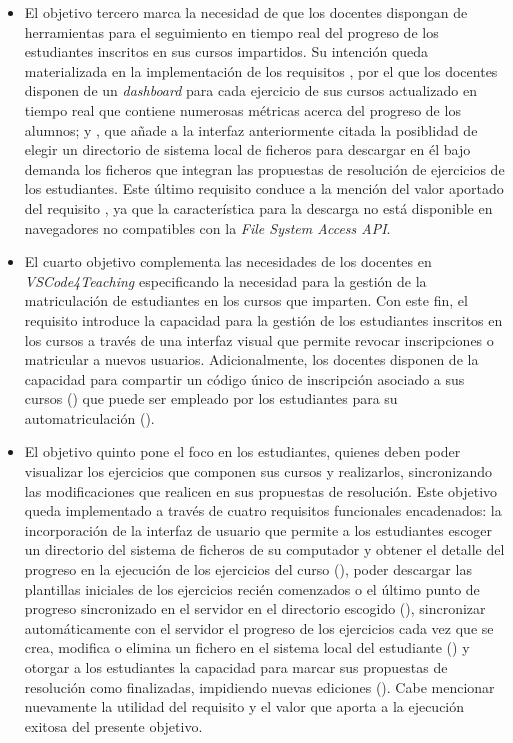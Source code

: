 \begin{itemize}
    \item El objetivo tercero marca la necesidad de que los docentes dispongan de herramientas para el seguimiento en tiempo real del progreso de los estudiantes inscritos en sus cursos impartidos. Su intención queda materializada en la implementación de los requisitos , por el que los docentes disponen de un \textit{dashboard} para cada ejercicio de sus cursos actualizado en tiempo real que contiene numerosas métricas acerca del progreso de los alumnos; y , que añade a la interfaz anteriormente citada la posiblidad de elegir un directorio de sistema local de ficheros para descargar en él bajo demanda los ficheros que integran las propuestas de resolución de ejercicios de los estudiantes. Este último requisito conduce a la mención del valor aportado del requisito , ya que la característica para la descarga no está disponible en navegadores no compatibles con la \textit{File System Access API}.

    \item El cuarto objetivo complementa las necesidades de los docentes en \textit{VSCode4Teaching} especificando la necesidad para la gestión de la matriculación de estudiantes en los cursos que imparten. Con este fin, el requisito  introduce la capacidad para la gestión de los estudiantes inscritos en los cursos a través de una interfaz visual que permite revocar inscripciones o matricular a nuevos usuarios. Adicionalmente, los docentes disponen de la capacidad para compartir un código único de inscripción asociado a sus cursos () que puede ser empleado por los estudiantes para su automatriculación ().
    
    \item El objetivo quinto pone el foco en los estudiantes, quienes deben poder visualizar los ejercicios que componen sus cursos y realizarlos, sincronizando las modificaciones que realicen en sus propuestas de resolución. Este objetivo queda implementado a través de cuatro requisitos funcionales encadenados: la incorporación de la interfaz de usuario que permite a los estudiantes escoger un directorio del sistema de ficheros de su computador y obtener el detalle del progreso en la ejecución de los ejercicios del curso (), poder descargar las plantillas iniciales de los ejercicios recién comenzados o el último punto de progreso sincronizado en el servidor en el directorio escogido (), sincronizar automáticamente con el servidor el progreso de los ejercicios cada vez que se crea, modifica o elimina un fichero en el sistema local del estudiante () y otorgar a los estudiantes la capacidad para marcar sus propuestas de resolución como finalizadas, impidiendo nuevas ediciones (). Cabe mencionar nuevamente la utilidad del requisito  y el valor que aporta a la ejecución exitosa del presente objetivo.
    

\end{itemize}
